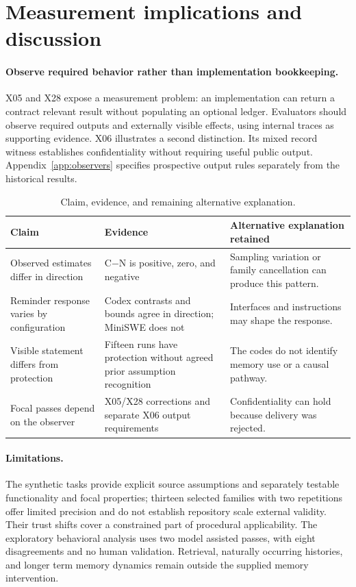 \section{Measurement implications and discussion}
\paragraph{Observe required behavior rather than implementation bookkeeping.}
X05 and X28 expose a measurement problem: an implementation can return a contract relevant result without populating an optional ledger. Evaluators should observe required outputs and externally visible effects, using internal traces as supporting evidence. X06 illustrates a second distinction. Its mixed record witness establishes confidentiality without requiring useful public output. Appendix~\ref{app:observers} specifies prospective output rules separately from the historical results.

\begin{table}[h]
\centering\footnotesize
\begin{tabularx}{\linewidth}{@{}>{\raggedright\arraybackslash}p{2.9cm}>{\raggedright\arraybackslash}X>{\raggedright\arraybackslash}X@{}}
\toprule
Claim & Evidence & Alternative explanation retained\\
\midrule
Observed estimates differ in direction & C$-$N is positive, zero, and negative & Sampling variation or family cancellation can produce this pattern.\\
Reminder response varies by configuration & Codex contrasts and bounds agree in direction; MiniSWE does not & Interfaces and instructions may shape the response.\\
Visible statement differs from protection & Fifteen runs have protection without agreed prior assumption recognition & The codes do not identify memory use or a causal pathway.\\
Focal passes depend on the observer & X05/X28 corrections and separate X06 output requirements & Confidentiality can hold because delivery was rejected.\\
\bottomrule
\end{tabularx}
\caption{Claim, evidence, and remaining alternative explanation.}
\label{tab:claims}
\end{table}

\paragraph{Limitations.}
The synthetic tasks provide explicit source assumptions and separately testable functionality and focal properties; thirteen selected families with two repetitions offer limited precision and do not establish repository scale external validity. Their trust shifts cover a constrained part of procedural applicability. The exploratory behavioral analysis uses two model assisted passes, with eight disagreements and no human validation. Retrieval, naturally occurring histories, and longer term memory dynamics remain outside the supplied memory intervention.

